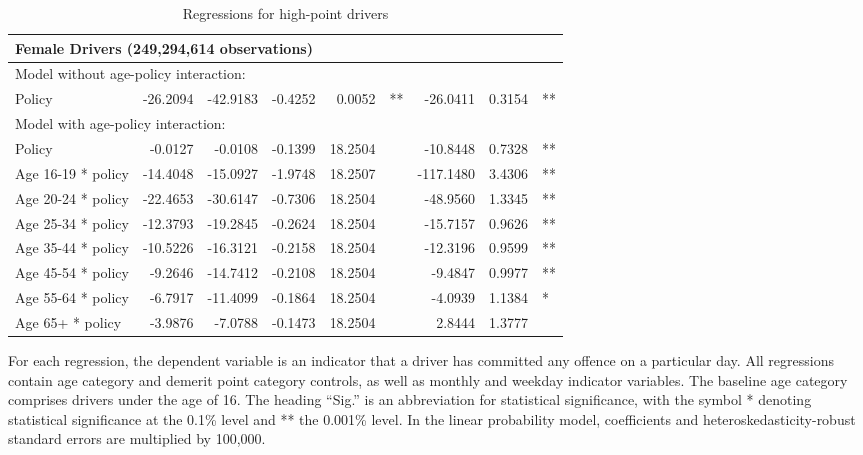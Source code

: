 \begin{table}
\begin{tabular}{l r r r r l r r l}
\hline 

\multicolumn{8}{l}{\textbf{Female Drivers} (249,294,614 observations)} \\ 

\hline
\multicolumn{8}{l}{Model without age-policy interaction: } \\ 
Policy                   &  -26.2094        &  -42.9183       &  -0.4252        &  0.0052       &   **       &  -26.0411        &  0.3154       &   **       \\ 
\hline
\multicolumn{8}{l}{Model with age-policy interaction: } \\ 
Policy                   &  -0.0127        &  -0.0108       &  -0.1399        &  18.2504       &            &  -10.8448        &  0.7328       &   **       \\ 
Age 16-19 * policy   &  -14.4048        &  -15.0927       &  -1.9748        &  18.2507       &            &  -117.1480        &  3.4306       &   **       \\ 
Age 20-24 * policy   &  -22.4653        &  -30.6147       &  -0.7306        &  18.2504       &            &  -48.9560        &  1.3345       &   **       \\ 
Age 25-34 * policy   &  -12.3793        &  -19.2845       &  -0.2624        &  18.2504       &            &  -15.7157        &  0.9626       &   **       \\ 
Age 35-44 * policy   &  -10.5226        &  -16.3121       &  -0.2158        &  18.2504       &            &  -12.3196        &  0.9599       &   **       \\ 
Age 45-54 * policy   &  -9.2646        &  -14.7412       &  -0.2108        &  18.2504       &            &  -9.4847        &  0.9977       &   **       \\ 
Age 55-64 * policy   &  -6.7917        &  -11.4099       &  -0.1864        &  18.2504       &            &  -4.0939        &  1.1384       &    *       \\ 
Age 65+ * policy   &  -3.9876        &  -7.0788       &  -0.1473        &  18.2504       &            &  2.8444        &  1.3777       &            \\ 

\hline 

\end{tabular} 
\caption{Regressions for high-point drivers} 
For each regression, the dependent variable is an indicator that a driver has committed  
any offence on a particular day.  
All regressions contain age category and demerit point category controls, 
as well as monthly and weekday indicator variables. 
The baseline age category comprises drivers under the age of 16. 
The heading ``Sig.'' is an abbreviation for statistical significance, with 
the symbol * denoting statistical significance at the 0.1\% level 
and ** the 0.001\% level. 
In the linear probability model, coefficients and heteroskedasticity-robust standard errors are  
multiplied by 100,000.  
\label{tab:seas_Logit_vs_LPMx100K_high_pt_regs} 
\end{table} 
 
